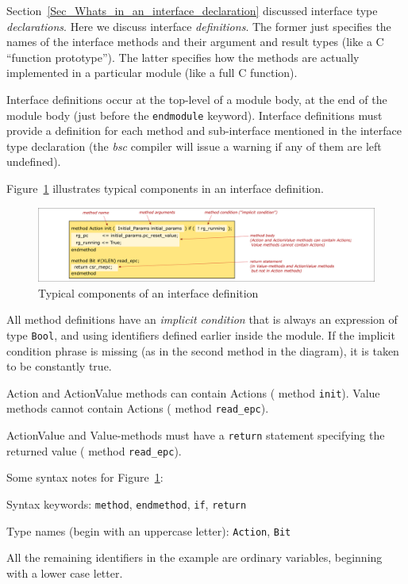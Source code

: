 \label{Sec_Whats_in_an_interface_definition}


Section~\ref{Sec_Whats_in_an_interface_declaration} discussed
interface type \emph{declarations}.  Here we discuss interface
\emph{definitions}.  The former just specifies the names of the
interface methods and their argument and result types (like a C
``function prototype'').  The latter specifies how the methods are
actually implemented in a particular module (like a full C function).

Interface definitions occur at the top-level of a module body, at the
end of the module body (just before the \verb|endmodule| keyword).
Interface definitions must provide a definition for each method and
sub-interface mentioned in the interface type declaration (the
\emph{bsc} compiler will issue a warning if any of them are left
undefined).

Figure~\ref{Fig_BSV_whats_in_an_interface_def} illustrates typical
components in an interface definition.
\begin{figure}[htbp]
  \centerline{\includegraphics[width=6in,angle=0]{Figures/Fig_BSV_whats_in_an_interface_def}}
  \caption{\label{Fig_BSV_whats_in_an_interface_def}
           Typical components of an interface definition}
\end{figure}
All method definitions have an \emph{implicit condition} that is
always an expression of type \verb|Bool|, and using identifiers
defined earlier inside the module.  If the implicit condition phrase
is missing (as in the second method in the diagram), it is taken to be
constantly true.

Action and ActionValue methods can contain Actions ({\eg} method
\verb|init|).  Value methods cannot contain Actions ({\eg} method
\verb|read_epc|).

ActionValue and Value-methods must have a \verb|return| statement
specifying the returned value ({\eg} method \verb|read_epc|).

Some syntax notes for Figure~\ref{Fig_BSV_whats_in_an_interface_def}:

\begin{tightlist}

 \item Syntax keywords: \verb|method|, \verb|endmethod|, \verb|if|, \verb|return|

 \item Type names (begin with an uppercase letter): \verb|Action|, \verb|Bit|

 \item All the remaining identifiers in the example are ordinary
       variables, beginning with a lower case letter.

\end{tightlist}

